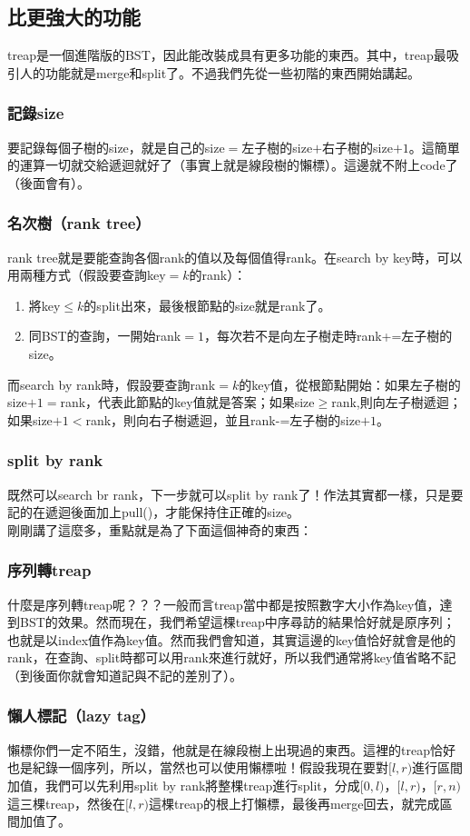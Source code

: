 \documentclass[main.tex]{subfiles}
\begin{document}
\subsection{比更強大的功能}
treap是一個進階版的BST，因此能改裝成具有更多功能的東西。其中，treap最吸引人的功能就是merge和split了。不過我們先從一些初階的東西開始講起。
\subsubsection{記錄size}
要記錄每個子樹的size，就是自己的size$=$左子樹的size$+$右子樹的size$+1$。這簡單的運算一切就交給遞迴就好了（事實上就是線段樹的懶標）。這邊就不附上code了（後面會有）。
\subsubsection{名次樹（rank tree）}
rank tree就是要能查詢各個rank的值以及每個值得rank。在search by key時，可以用兩種方式（假設要查詢key$=k$的rank）：
\begin{enumerate}
\item 將key$\leq k$的split出來，最後根節點的size就是rank了。
\item 同BST的查詢，一開始rank$=1$，每次若不是向左子樹走時rank+=左子樹的size。
\end{enumerate}
而search by rank時，假設要查詢rank$=k$的key值，從根節點開始：如果左子樹的size$+1=$rank，代表此節點的key值就是答案；如果size$\geq $rank,則向左子樹遞迴；如果size$+1<$rank，則向右子樹遞迴，並且rank-=左子樹的size$+1$。
\subsubsection{split by rank}
既然可以search br rank，下一步就可以split by rank了！作法其實都一樣，只是要記的在遞迴後面加上pull()，才能保持住正確的size。\\

剛剛講了這麼多，重點就是為了下面這個神奇的東西：
\subsubsection{序列轉treap}
什麼是序列轉treap呢？？？一般而言treap當中都是按照數字大小作為key值，達到BST的效果。然而現在，我們希望這棵treap中序尋訪的結果恰好就是原序列；也就是以index值作為key值。然而我們會知道，其實這邊的key值恰好就會是他的rank，在查詢、split時都可以用rank來進行就好，所以我們通常將key值省略不記（到後面你就會知道記與不記的差別了）。
\subsubsection{懶人標記（lazy tag）}
懶標你們一定不陌生，沒錯，他就是在線段樹上出現過的東西。這裡的treap恰好也是紀錄一個序列，所以，當然也可以使用懶標啦！假設我現在要對$[l,r)$進行區間加值，我們可以先利用split by rank將整棵treap進行split，分成$[0,l)$，$[l,r)$，$[r,n)$這三棵treap，然後在$[l,r)$這棵treap的根上打懶標，最後再merge回去，就完成區間加值了。
\end{document}
